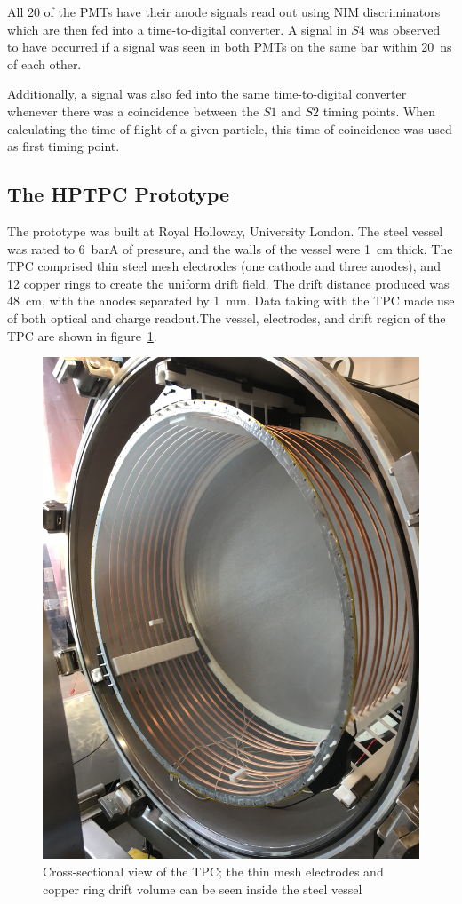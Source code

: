 All 20 of the PMTs have their anode signals read out using NIM discriminators which are then fed into a time-to-digital converter. A signal in $S4$ was observed to have occurred if a signal was seen in both PMTs on the same bar within 20~ns of each other. 

Additionally, a signal was also fed into the same time-to-digital converter whenever there was a coincidence between the $S1$ and $S2$ timing points. When calculating the time of flight of a given particle, this time of coincidence was used as first timing point.

\subsection{The HPTPC Prototype}
The prototype was built at Royal Holloway, University London.  The steel vessel was rated to 6~barA of pressure, and the walls of the vessel were 1~cm thick.
The TPC comprised thin steel mesh electrodes (one cathode and three anodes), and 12 copper rings to create the uniform drift field. The drift distance produced was 48~cm, with the anodes separated by 1~mm. Data taking with the TPC made use of both optical and charge readout.The vessel, electrodes, and drift region of the TPC are shown in figure~\ref{fig:TPC}.
    
     \begin{figure}
      \centering
    \includegraphics[width=0.6\linewidth]{files/Figures/IMG_1194.jpg}
    	\caption{Cross-sectional view of the TPC; the thin mesh electrodes and copper ring drift volume can be seen inside the steel vessel}
    		\label{fig:TPC}
    \end{figure}
    
